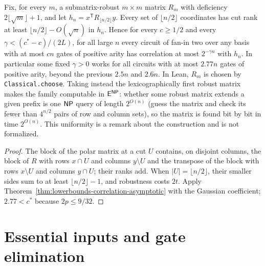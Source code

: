 \begin{theorem}
  \label{thm:lowerbounds-correlation-explicit}
  \leanok
  Fix, for every $m$, a submatrix-robust $m\times m$ matrix $R_m$ with deficiency
  $2\lfloor\sqrt m\rfloor+1$, and let $h_n=x^{\mathsf T}R_{\lfloor n/2\rfloor}y$.
  Every set of $\lfloor n/2\rfloor$ coordinates has cut rank at least
  $\lfloor n/2\rfloor-O(\sqrt n)$ in $h_n$. Hence for every $c\ge1/2$ and every
  $\gamma<(c^*-c)/(2L)$, for all large $n$ every circuit of fan-in two over any
  basis with at most $cn$ gates of positive arity has correlation at most
  $2^{-\gamma n}$ with $h_n$. In particular some fixed $\gamma>0$ works for all
  circuits with at most $2.77n$ gates of positive arity, beyond the previous
  $2.5n$ and $2.6n$. In Lean, $R_m$ is chosen by \texttt{Classical.choose}.
  Taking instead the lexicographically first robust matrix makes the family
  computable in $\mathsf{E}^{\mathsf{NP}}$: whether some robust matrix extends a given
  prefix is one $\mathsf{NP}$ query of length $2^{O(n)}$ (guess the matrix and check
  its fewer than $4^{n/2}$ pairs of row and column sets), so the matrix is found
  bit by bit in time $2^{O(n)}$. This uniformity is a remark about the
  construction and is not formalized.
\end{theorem}
\begin{proof}
  \leanok
  The block of the polar matrix at a cut $U$ contains, on disjoint columns, the
  block of $R$ with rows $x\cap U$ and columns $y\setminus U$ and the transpose of
  the block with rows $x\setminus U$ and columns $y\cap U$; their ranks add. When
  $|U|=\lfloor n/2\rfloor$, their smaller sides sum to at least
  $\lfloor n/2\rfloor-1$, and robustness costs $2t$. Apply
  Theorem~\ref{thm:lowerbounds-correlation-asymptotic} with the Gaussian
  coefficient; $2.77<c^*$ because $2p\le9/32$.
\end{proof}

\section{Essential inputs and gate elimination}
\label{sec:lowerbounds-gate-elimination}

